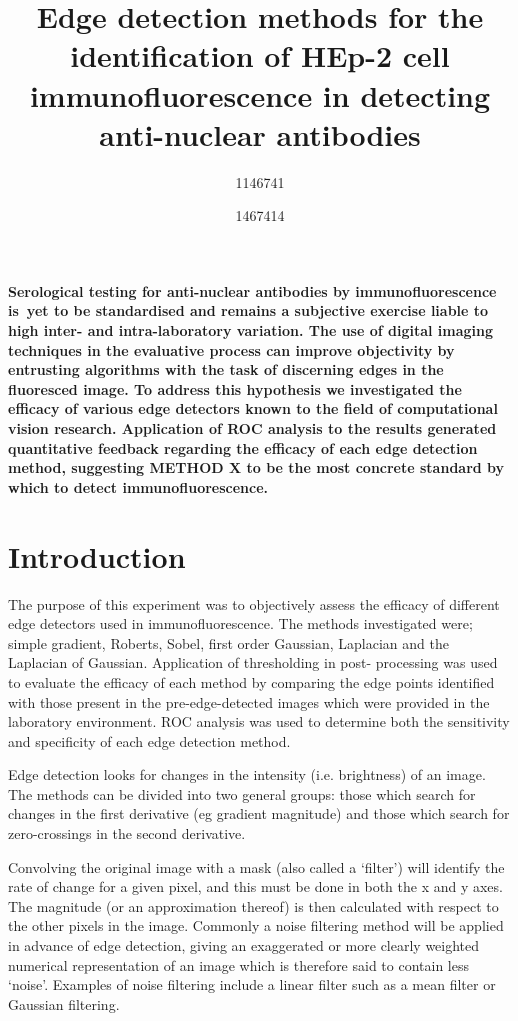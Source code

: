 \documentclass[a4paper]{article}
\title {\vspace{-3ex}Edge detection methods for the identification of HEp-2 cell immunofluorescence in detecting anti-nuclear antibodies}
\author {1146741 \and 1467414}
\begin{document}
\maketitle

\begin{multicols*}{2}

\noindent \textbf{\small Serological testing for anti-nuclear antibodies by immunofluorescence is~yet to be standardised and remains a subjective exercise liable to high inter- and intra-laboratory variation. The use of digital imaging techniques in the evaluative process can improve objectivity by entrusting algorithms with the task of discerning edges in the fluoresced image. To address this hypothesis we investigated the efficacy of various edge detectors known to the field of computational vision research. Application of ROC analysis to the results generated quantitative feedback regarding the efficacy of each edge detection method, suggesting METHOD X to be the most concrete standard by which to detect immunofluorescence.}

\section*{Introduction}

The purpose of this experiment was to objectively assess the efficacy of different edge detectors used in immunofluorescence. The methods investigated were; simple gradient, Roberts, Sobel, first order Gaussian, Laplacian and the Laplacian of Gaussian. Application of thresholding in post- processing was used to evaluate the efficacy of each method by comparing the edge points identified with those present in the pre-edge-detected images which were provided in the laboratory environment. ROC analysis was used to determine both the sensitivity and specificity of each edge detection method. 

Edge detection looks for changes in the intensity (i.e. brightness) of an image. The methods can be divided into two general groups: those which search for changes in the first derivative (eg gradient magnitude) and those which search for zero-crossings in the second derivative. 

Convolving the original image with a mask (also called a ‘filter’) will identify the rate of change for a given pixel, and this must be done in both the x and y axes. The magnitude (or an approximation thereof) is then calculated with respect to the other pixels in the image. Commonly a noise filtering method will be applied in advance of edge detection, giving an exaggerated or more clearly weighted numerical representation of an image which is therefore said to contain less ‘noise’. Examples of noise filtering include a linear filter such as a mean filter or Gaussian filtering.


\end{multicols*}
\end{document}
